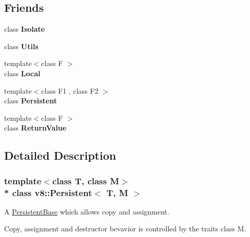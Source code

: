 \subsection*{Friends}
\begin{DoxyCompactItemize}
\item 
class {\bfseries Isolate}\hypertarget{classv8_1_1_persistent_aba4f0964bdacf2bbf62cf876e5d28d0a}{}\label{classv8_1_1_persistent_aba4f0964bdacf2bbf62cf876e5d28d0a}

\item 
class {\bfseries Utils}\hypertarget{classv8_1_1_persistent_abc0f7da619e9e72510dc07ed7b5ff6d8}{}\label{classv8_1_1_persistent_abc0f7da619e9e72510dc07ed7b5ff6d8}

\item 
{\footnotesize template$<$class F $>$ }\\class {\bfseries Local}\hypertarget{classv8_1_1_persistent_afb872edb4aac7ba55f0da004113aa2b0}{}\label{classv8_1_1_persistent_afb872edb4aac7ba55f0da004113aa2b0}

\item 
{\footnotesize template$<$class F1 , class F2 $>$ }\\class {\bfseries Persistent}\hypertarget{classv8_1_1_persistent_ad845ec8872174be0a9ca9a3dd1898d30}{}\label{classv8_1_1_persistent_ad845ec8872174be0a9ca9a3dd1898d30}

\item 
{\footnotesize template$<$class F $>$ }\\class {\bfseries Return\+Value}\hypertarget{classv8_1_1_persistent_a53f604d3d6f2dc0647df33c9979f116a}{}\label{classv8_1_1_persistent_a53f604d3d6f2dc0647df33c9979f116a}

\end{DoxyCompactItemize}


\subsection{Detailed Description}
\subsubsection*{template$<$class T, class M$>$\\*
class v8\+::\+Persistent$<$ T, M $>$}

A \hyperlink{classv8_1_1_persistent_base}{Persistent\+Base} which allows copy and assignment.

Copy, assignment and destructor bevavior is controlled by the traits class M.

